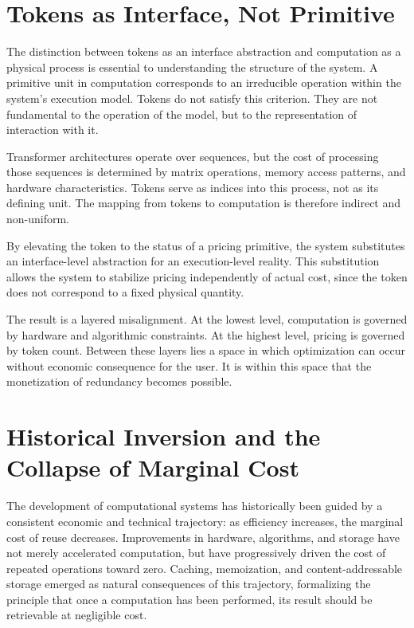 \documentclass[12pt, oneside]{article}
\begin{document}
\section{Tokens as Interface, Not Primitive}

The distinction between tokens as an interface abstraction and computation as a physical process is essential to understanding the structure of the system. A primitive unit in computation corresponds to an irreducible operation within the system’s execution model. Tokens do not satisfy this criterion. They are not fundamental to the operation of the model, but to the representation of interaction with it.

Transformer architectures operate over sequences, but the cost of processing those sequences is determined by matrix operations, memory access patterns, and hardware characteristics. Tokens serve as indices into this process, not as its defining unit. The mapping from tokens to computation is therefore indirect and non-uniform.

By elevating the token to the status of a pricing primitive, the system substitutes an interface-level abstraction for an execution-level reality. This substitution allows the system to stabilize pricing independently of actual cost, since the token does not correspond to a fixed physical quantity.

The result is a layered misalignment. At the lowest level, computation is governed by hardware and algorithmic constraints. At the highest level, pricing is governed by token count. Between these layers lies a space in which optimization can occur without economic consequence for the user. It is within this space that the monetization of redundancy becomes possible.

\section{Historical Inversion and the Collapse of Marginal Cost}

The development of computational systems has historically been guided by a consistent economic and technical trajectory: as efficiency increases, the marginal cost of reuse decreases. Improvements in hardware, algorithms, and storage have not merely accelerated computation, but have progressively driven the cost of repeated operations toward zero. Caching, memoization, and content-addressable storage emerged as natural consequences of this trajectory, formalizing the principle that once a computation has been performed, its result should be retrievable at negligible cost.
\end{document}

